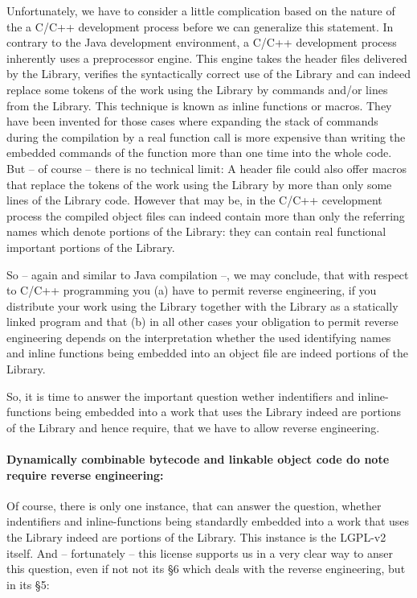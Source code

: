 Unfortunately, we have to consider a little complication based on the nature of
the a C/C++ development process before we can generalize this statement. In
contrary to the Java development environment, a C/C++ development process
inherently uses a preprocessor engine. This engine takes the header files
delivered by the Library, verifies the syntactically correct use of the Library
and can indeed replace some tokens of the work using the Library by commands
and/or lines from the Library. This technique is known as inline functions or
macros. They have been invented for those cases where expanding the stack of
commands during the compilation by a real function call is more expensive than
writing the embedded commands of the function more than one time into the whole
code. But -- of course -- there is no technical limit: A header file could also
offer macros that replace the tokens of the work using the Library by more than
only some lines of the Library code. However that may be, in the C/C++
cevelopment process the compiled object files can indeed contain more than only
the referring names which denote portions of the Library: they can contain real
functional important portions of the Library.
 
So -- again and similar to Java compilation --, we may conclude, that with
respect to C/C++ programming you (a) have to permit reverse engineering, if you
distribute your work using the Library together with the Library as a statically
linked program and that (b) in all other cases your obligation to permit reverse
engineering depends on the interpretation whether the used identifying names and
inline functions being embedded into an object file are indeed portions of the
Library.

So, it is time to answer the important question wether indentifiers and
inline-functions being embedded into a work that uses the Library indeed are
portions of the Library and hence require, that we have to allow reverse
engineering.

\paragraph{Dynamically combinable bytecode and linkable object code do note
require reverse engineering:} Of course, there is only one instance, that can
answer the question, whether indentifiers and inline-functions being standardly
embedded into a work that uses the Library indeed are portions of the Library.
This instance is the LGPL-v2 itself. And -- fortunately -- this license supports
us in a very clear way to anser this question, even if not not its §6 which
deals with the reverse engineering, but in its §5:

